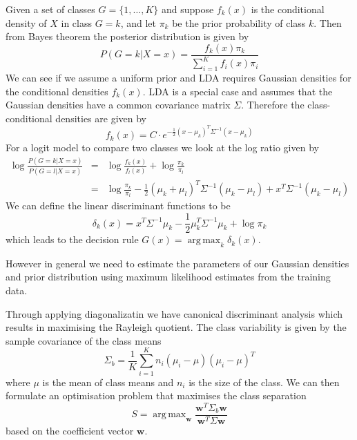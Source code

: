 \documentclass[11pt]{article}
\DeclareMathOperator*{\argmax}{arg\,max}
\begin{document}
Given a set of classes $G=\{1,\dots,K\}$ and suppose $f_k(x)$ is the conditional density of $X$ in class $G=k$, and let $\pi_k$ be the prior probability of class $k$. Then from Bayes theorem the posterior distribution is given by
\begin{equation}\nonumber
P(G=k|X=x)=\frac{f_k(x)\pi_k}{\sum_{i=1}^{K}f_i(x)\pi_i}
\end{equation} 
We can see if we assume a uniform prior and LDA requires Gaussian densities for the conditional densities $f_k(x)$. LDA is a special case and assumes that the Gaussian densities have a common covariance matrix $\Sigma$. Therefore the class-conditional densities are given by
\begin{equation}\nonumber
f_k(x)=C\cdot e^{-\frac{1}{2}(x-\mu_k)^T\Sigma^{-1}(x-\mu_k)}
\end{equation}
For a logit model to compare two classes we look at the log ratio given by
\begin{eqnarray*}
\log \frac{P(G=k|X=x)}{P(G=l|X=x)}&=&\log \frac{f_k(x)}{f_l(x)}+\log \frac{\pi_k}{\pi_l}\\
&=&\log \frac{\pi_k}{\pi_l}-\frac{1}{2}(\mu_k+\mu_l)^T\Sigma^{-1}(\mu_k-\mu_l)+x^T\Sigma^{-1}(\mu_k-\mu_l)
\end{eqnarray*}
We can define the linear discriminant functions to be 
\begin{equation}\nonumber
\delta_k(x)=x^T\Sigma^{-1}\mu_k-\frac{1}{2}\mu_k^T\Sigma^{-1}\mu_k+\log \pi_k
\end{equation}
which leads to the decision rule $G(x)=\argmax_k \delta_k(x)$. 

However in general we need to estimate the parameters of our Gaussian densities and prior distribution using maximum likelihood estimates from the training data.  
 
Through applying diagonalizatin we have canonical discriminant analysis which results in maximising the Rayleigh quotient. The class variability is given by the sample covariance of the class means
\begin{equation}\nonumber
\Sigma_b=\frac{1}{K}\sum_{i=1}^{K}n_i(\mu_i-\mu)(\mu_i-\mu)^T
\end{equation} 
where $\mu$ is the mean of class means and $n_i$ is the size of the class. We can then formulate an optimisation problem that maximises the class separation
\begin{equation}\nonumber
S=\argmax_{\bm w}\frac{\bm w^T\Sigma_b\bm w}{\bm w^T\Sigma\bm w}
\end{equation}
based on the coefficient vector $\bm w$. 
\end{document}
